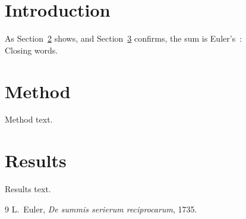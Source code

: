 \documentclass{article}
\begin{document}
\section{Introduction}
As Section~\ref{sec:method} shows, and Section~\ref{sec:results}
confirms, the sum is Euler's~\cite{euler1735}:
\[ \]
Closing words.

\newpage
\section{Method}\label{sec:method}
Method text.

\newpage
\section{Results}\label{sec:results}
Results text.

\begin{thebibliography}{9}
 L.~Euler, \emph{De summis serierum reciprocarum}, 1735.
\end{thebibliography}
\end{document}

